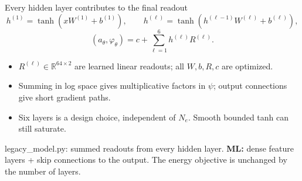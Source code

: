 \documentclass[aspectratio=169,10pt]{beamer}
\newcommand{\src}[1]{\vfill{\fontsize{6.3}{7.5}\selectfont\color{muted}#1\par}}
\newcommand{\ml}[1]{{\color{teal}\textbf{ML:} #1}}
\newcommand{\R}{\mathbb R}
\begin{document}
\begin{frame}{Every hidden layer contributes to the final readout}
\[
h^{(1)}=\tanh(xW^{(1)}+b^{(1)}),\qquad
h^{(\ell)}=\tanh(h^{(\ell-1)}W^{(\ell)}+b^{(\ell)}),
\]
\[
\boxed{(a_\theta,\varphi_\theta)=c+\sum_{\ell=1}^{6}h^{(\ell)}R^{(\ell)}}.
\]
\begin{center}\vspace{-1mm}
\end{center}
\begin{itemize}\setlength\itemsep{3pt}
\item $R^{(\ell)}\in\R^{64\times2}$ are learned linear readouts; all $W,b,R,c$ are optimized.
\item Summing in log space gives multiplicative factors in $\psi$; output connections give short gradient paths.
\item Six layers is a design choice, independent of $N_e$. Smooth bounded tanh can still saturate.
\end{itemize}
\src{legacy\_model.py: summed readouts from every hidden layer. \ml{dense feature layers + skip connections to the output.} The energy objective is unchanged by the number of layers.}
\end{frame}
\end{document}

